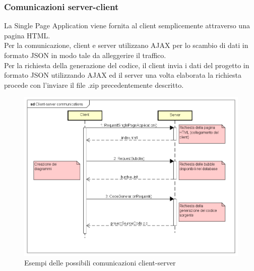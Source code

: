\documentclass[../DefinizioneDiProdotto.tex]{subfiles}
\begin{document}
				\subsubsection{Comunicazioni server-client}
					La Single Page Application viene fornita al client semplicemente attraverso una
					pagina HTML.\\
					Per la comunicazione, client e server utilizzano AJAX per lo
					scambio di dati in formato JSON in modo tale da alleggerire il traffico.\\
					Per la richiesta della generazione del codice, il client invia i dati del progetto
					in formato JSON utilizzando AJAX ed il server una volta elaborata la richiesta procede
					con l'inviare il file .zip precedentemente descritto.
					\begin{figure}[H] \label{fig:ClientServerCommunications}
						\centering
						\includegraphics[scale=0.4]{Immagini/ClientServerCommunications.png}
						\caption{Esempi delle possibili comunicazioni client-server}
					\end{figure}
	
\end{document}
